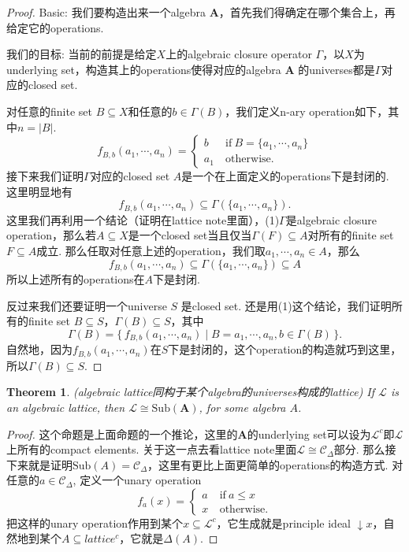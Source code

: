 \documentclass{article}
\newtheorem{theorem}{Theorem}[section]
\newcommand\Set[2]{\{\,#1\mid#2\,\}} %
\newcommand\lattice{\mathcal{L}}
\newcommand\algebra{\mathbf{A}}
\newcommand\Sub[1]{\text{Sub}(#1)}
\begin{document}
\begin{proof}
Basic: 我们要构造出来一个algebra $\algebra$，首先我们得确定在哪个集合上，再给定它的operations. 

我们的目标: 当前的前提是给定$X$上的algebraic closure operator $\Gamma$，以$X$为underlying set，构造其上的operations使得对应的algebra $\algebra$ 的universes都是$\Gamma$对应的closed set.

对任意的finite set $B \subseteq X$和任意的$b \in \Gamma(B)$，我们定义n-ary operation如下，其中$n = |B|$.
$$
f_{B,b}(a_1,\cdots,a_n) = \left\{
\begin{array}{ll} 
b \ & \text{if}\ B=\{a_1,\cdots,a_n\} \\ 
a_1\ & \text{otherwise}.  
\end{array}
\right.   
$$
接下来我们证明$\Gamma$对应的closed set $A$是一个在上面定义的operations下是封闭的. 这里明显地有
$$
f_{B,b}(a_1,\cdots,a_n) \subseteq \Gamma(\{a_1,\cdots,a_n\}).
$$
这里我们再利用一个结论（证明在lattice note里面），(1)$\Gamma$是algebraic closure operation，那么若$A \subseteq X$是一个closed set当且仅当$\Gamma(F) \subseteq A$对所有的finite set $F \subseteq A$成立. 那么任取对任意上述的operation，我们取$a_1,\cdots,a_n \in A$，那么
$$
f_{B,b}(a_1,\cdots,a_n) \subseteq \Gamma(\{a_1,\cdots,a_n\}) \subseteq A
$$
所以上述所有的operations在$A$下是封闭.

反过来我们还要证明一个universe $S$ 是closed set. 还是用(1)这个结论，我们证明所有的finite set $B \subseteq S$，$\Gamma(B) \subseteq S$，其中
$$
\Gamma(B) = \Set{f_{B,b}(a_1,\cdots,a_n)}{B={a_1,\cdots,a_n},b \in \Gamma(B)}.
$$
自然地，因为$f_{B,b}(a_1,\cdots,a_n)$在$S$下是封闭的，这个operation的构造就巧到这里，所以$\Gamma(B) \subseteq S$.
\end{proof}


\begin{theorem}
\rm {\color{red} (algebraic lattice同构于某个algebra的universes构成的lattice)} If $\lattice$ is an algebraic lattice, then $\lattice \cong \Sub{\algebra}$, for some algebra $A$.
\end{theorem}

\begin{proof}
这个命题是上面命题的一个推论，这里的$\algebra$的underlying set可以设为$\lattice^c$即$\lattice$上所有的compact elements. 关于这一点去看lattice note里面$\lattice \cong \mathcal{C}_{\Delta}$部分. 那么接下来就是证明$\Sub{A} =  \mathcal{C}_{\Delta}$，这里有更比上面更简单的operations的构造方式. 对任意的$a \in \mathcal{C}_{\Delta}$, 定义一个unary operation
$$
f_{a}(x) = \left\{
\begin{array}{ll} 
a \ & \text{if}\ a \leq x \\ 
x\ & \text{otherwise}.  
\end{array}
\right.  
$$
把这样的unary operation作用到某个$x \subseteq \lattice^c$，它生成就是principle ideal $\downarrow x$，自然地到某个$A \subseteq lattice^c$，它就是$\Delta(A)$.
\end{proof}
\end{document}
